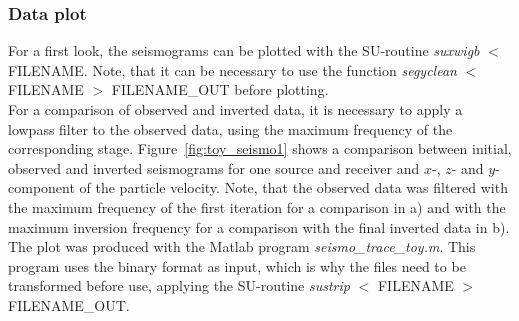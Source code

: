 \subsubsection*{Data plot}
For a first look, the seismograms can be plotted with the SU-routine \textit{suxwigb} $<$ FILENAME. Note, that it can be necessary to use the function \textit{segyclean} $<$ FILENAME $>$ FILENAME\_OUT before plotting.\\
For a comparison of observed and inverted data, it is necessary to apply a lowpass filter to the observed data, using the maximum frequency of the corresponding stage. Figure~\ref{fig:toy_seismo1} shows a comparison between initial, observed and inverted seismograms for one source and receiver and $x$-, $z$- and $y$-component of the particle velocity. Note, that the observed data was filtered with the maximum frequency of the first iteration for a comparison in a) and with the maximum inversion frequency for a comparison with the final inverted data in b). The plot was produced with the Matlab program \textit{seismo\_trace\_toy.m}. This program uses the binary format as input, which is why the files need to be transformed before use, applying the SU-routine \textit{sustrip} $<$ FILENAME $>$ FILENAME\_OUT.
